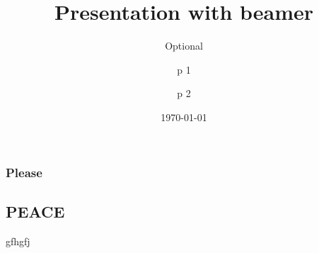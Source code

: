 \documentclass{beamer}
\title{Presentation with beamer}
\subtitle{Optional}
\author{p 1\inst{1}\and p 2\inst{2}}
\institute{MIT,Manipal}
\date{\today}
\begin{document}
	\frame{\titlepage}
	\begin{frame}
		\frametitle{Please}
		\tableofcontents
	\end{frame}
\begin{frame}
	\section{PEACE}
	gfhgfj
	\end{frame}
\end{document}
